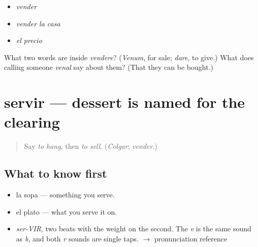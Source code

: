 \begin{itemize}
\raggedright
  \item \emph{vender}
  \item \emph{vender la casa}
  \item \emph{el precio}
\end{itemize}

\begin{tcolorbox}[breakable,colback=teal!4,colframe=teal!35!black,title={Before you move on}]
What two words are inside \emph{vendere}? (\emph{Venum}, for sale; \emph{dare}, to give.) What does calling someone \emph{venal} say about them? (That they can be bought.)
\end{tcolorbox}
\section[servir]{servir — dessert is named for the clearing}

\label{lesson:ES-C386-servir}



\begin{quote}
Say \emph{to hang}, then \emph{to sell}. (\emph{Colgar}; \emph{vender}.)
\end{quote}

\subsection*{What to know first}
\begin{itemize}
\raggedright
  \item la sopa — something you serve.
  \item el plato — what you serve it on.
\end{itemize}

\begin{sounds}
\begin{itemize}
\raggedright
  \item \emph{ser-VIR}, two beats with the weight on the second. The \emph{v} is the same sound as \emph{b}, and both \emph{r} sounds are single taps. $\to$ pronunciation reference
\end{itemize}
\end{sounds}

